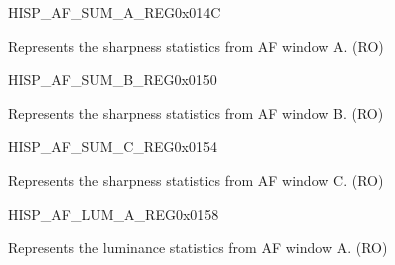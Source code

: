 \begin{register}{H}{ISP\_AF\_SUM\_A\_REG}{0x014C}\label{regdesc:ISPAFSUMAREG}
%
%
\regnewline%
\begin{regdesc}\begin{reglist}
\label{fielddesc:ISPAFSUMA}\item [ISP\_AF\_SUMA] Represents the sharpness statistics from AF window A. (RO)
\end{reglist}\end{regdesc}
\end{register}


\begin{register}{H}{ISP\_AF\_SUM\_B\_REG}{0x0150}\label{regdesc:ISPAFSUMBREG}
%
%
\regnewline%
\begin{regdesc}\begin{reglist}
\label{fielddesc:ISPAFSUMB}\item [ISP\_AF\_SUMB] Represents the sharpness statistics from AF window B. (RO)
\end{reglist}\end{regdesc}
\end{register}


\begin{register}{H}{ISP\_AF\_SUM\_C\_REG}{0x0154}\label{regdesc:ISPAFSUMCREG}
%
%
\regnewline%
\begin{regdesc}\begin{reglist}
\label{fielddesc:ISPAFSUMC}\item [ISP\_AF\_SUMC] Represents the sharpness statistics from AF window C. (RO)
\end{reglist}\end{regdesc}
\end{register}


\begin{register}{H}{ISP\_AF\_LUM\_A\_REG}{0x0158}\label{regdesc:ISPAFLUMAREG}
%
%
\regnewline%
\begin{regdesc}\begin{reglist}
\label{fielddesc:ISPAFLUMA}\item [ISP\_AF\_LUMA] Represents the luminance statistics from AF window A. (RO)
\end{reglist}\end{regdesc}
\end{register}


